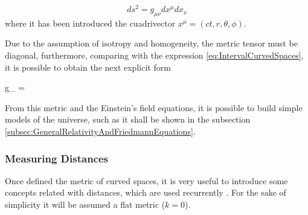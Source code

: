 \[ ds^2 = g_{\mu \nu}dx^\mu dx_\nu \]
where it has been introduced the cuadrivector $x^\mu = 
(ct, r, \theta, \phi)$.


Due to the assumption of isotropy and homogeneity, the metric tensor must
be diagonal, furthermore, comparing with the expression 
\ref{eq:IntervalCurvedSpaces}, it is possible to obtain the next explicit 
form



{g_{\mu \nu} = }


From this metric and the Einstein's field equations, it is possible to 
build simple models of the universe, such as it shall be shown in the 
subsection \ref{subsec:GeneralRelativityAndFriedmannEquations}.



			\subsubsection*{Measuring Distances}


Once defined the metric of curved spaces, it is very useful to introduce
some concepts related with distances, which are used recurrently 
\cite{longair2008}. For the sake of simplicity it will be assumed a flat 
metric ($k = 0$).


